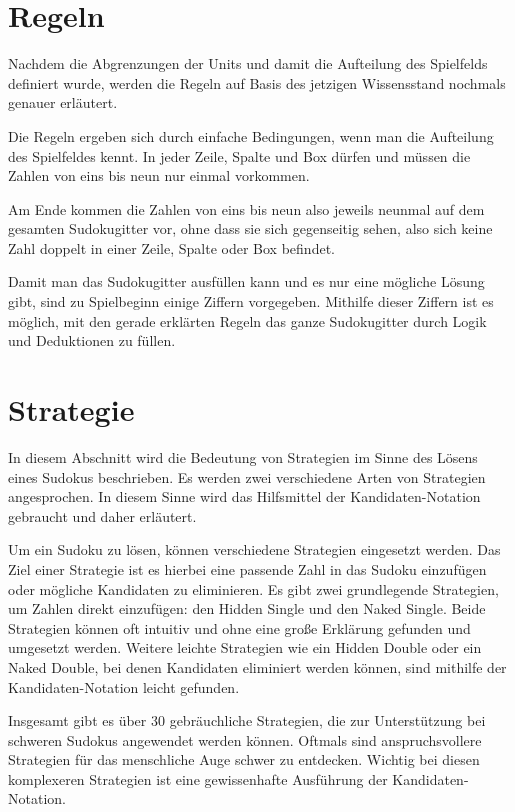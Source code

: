 \section{Regeln}
Nachdem die Abgrenzungen der Units und damit die Aufteilung des Spielfelds definiert wurde, werden die Regeln auf Basis des jetzigen Wissensstand nochmals genauer erläutert.

Die Regeln ergeben sich durch einfache Bedingungen, wenn man die Aufteilung des Spielfeldes kennt. In jeder Zeile, Spalte und Box dürfen und müssen die Zahlen von eins bis neun nur einmal vorkommen.

Am Ende kommen die Zahlen von eins bis neun also jeweils neunmal auf dem gesamten Sudokugitter vor, ohne dass sie sich gegenseitig sehen, also sich keine Zahl doppelt in einer Zeile, Spalte oder Box befindet.

Damit man das Sudokugitter ausfüllen kann und es nur eine mögliche Lösung gibt, sind zu Spielbeginn einige Ziffern vorgegeben. Mithilfe dieser Ziffern ist es möglich, mit den gerade erklärten Regeln das ganze Sudokugitter durch Logik und Deduktionen zu füllen. \cite{sudopedia_2022} \cite{martin}

\section{Strategie}
In diesem Abschnitt wird die Bedeutung von Strategien im Sinne des Lösens eines Sudokus beschrieben. Es werden zwei verschiedene Arten von Strategien angesprochen. In diesem Sinne wird das Hilfsmittel der Kandidaten-Notation gebraucht und daher erläutert.

Um ein Sudoku zu lösen, können verschiedene Strategien eingesetzt werden. Das Ziel einer Strategie ist es hierbei eine passende Zahl in das Sudoku einzufügen oder mögliche Kandidaten zu eliminieren. Es gibt zwei grundlegende Strategien, um Zahlen direkt einzufügen: den Hidden Single und den Naked Single. Beide Strategien können oft intuitiv und ohne eine große Erklärung gefunden und umgesetzt werden. Weitere leichte Strategien wie ein Hidden Double oder ein Naked Double, bei denen Kandidaten eliminiert werden können, sind mithilfe der Kandidaten-Notation leicht gefunden.

Insgesamt gibt es über 30 gebräuchliche Strategien, die zur Unterstützung bei schweren Sudokus angewendet werden können. Oftmals sind anspruchsvollere Strategien für das menschliche Auge schwer zu entdecken. Wichtig bei diesen komplexeren Strategien ist eine gewissenhafte Ausführung der Kandidaten-Notation. \cite{martin} \cite[9]{zambon2015sudoku}

